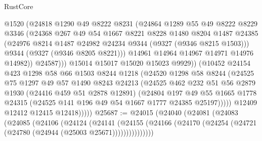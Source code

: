 \begin{lexlean}{RustCore}
\begin{coremodule}
                      @1520
                      (@24818
                        @1290
                        @49
                        @8222
                        @8231
                        (@24864
                          @1289
                          @55
                          @49
                          @8222
                          @8229
                          @3346
                          (@24368
                            @267
                            @49
                            @54
                            @1667
                            @8221
                            @8228
                            @1480
                            @8204
                            @1487
                            @24385
                            (@24976 @8214 @1487 @24982 @24234 @9344 (@9327 (@9346 @8215 @1503)))
                            @9344
                            (@9327 (@9346 @8205 @8221)))
                          @14961
                          @14964
                          @14967
                          @14971
                          @14976
                          @14982))
                      @24587)))
                @15014
                @15017
                @15020
                @15023
                @9929))
            (@10452
              @24154
              @423
              @1298
              @58
              @66
              @1503
              @8244
              @1218
              (@24520
                @1298
                @58
                @8244
                (@24525
                  @75
                  @1297
                  @49
                  @57
                  @1490
                  @8243
                  @24213
                  (@24525
                    @462
                    @232
                    @51
                    @56
                    @2879
                    @1930
                    (@24416 @459 @51 @2878 @12891)
                    (@24804
                      @197
                      @49
                      @55
                      @1665
                      @1778
                      @24315
                      (@24525 @141 @196 @49 @54 @1667 @1777 @24385 @25197)))))
              @12409
              @12412
              @12415
              @12418)))))
@25687 := @24015
    (@24040
      (@24081
        (@24083
          (@24085
            (@24106
              (@24124
                (@24141
                  (@24155
                    (@24166 (@24170 (@24254 (@24721 (@24780 (@24944 (@25003 @25671)))))))))))))))

\end{coremodule}
\end{lexlean}

